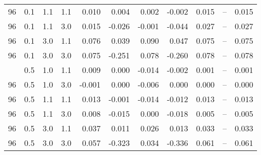 \begin{longtable}[t]{ccccrrrrrrc}
96 & 0.1 & 1.1 & 1.1 & 0.010 & 0.004 & 0.002 & -0.002 & 0.015 & -- & 0.015\\
96 & 0.1 & 1.1 & 3.0 & 0.015 & -0.026 & -0.001 & -0.044 & 0.027 & -- & 0.027\\
96 & 0.1 & 3.0 & 1.1 & 0.076 & 0.039 & 0.090 & 0.047 & 0.075 & -- & 0.075\\
96 & 0.1 & 3.0 & 3.0 & 0.075 & -0.251 & 0.078 & -0.260 & 0.078 & -- & 0.078\\
\addlinespace
96 & 0.5 & 1.0 & 1.1 & 0.009 & 0.000 & -0.014 & -0.002 & 0.001 & -- & 0.001\\
96 & 0.5 & 1.0 & 3.0 & -0.001 & 0.000 & -0.006 & 0.000 & 0.000 & -- & 0.000\\
96 & 0.5 & 1.1 & 1.1 & 0.013 & -0.001 & -0.014 & -0.012 & 0.013 & -- & 0.013\\
96 & 0.5 & 1.1 & 3.0 & 0.008 & -0.015 & 0.000 & -0.018 & 0.005 & -- & 0.005\\
96 & 0.5 & 3.0 & 1.1 & 0.037 & 0.011 & 0.026 & 0.013 & 0.033 & -- & 0.033\\
96 & 0.5 & 3.0 & 3.0 & 0.057 & -0.323 & 0.034 & -0.336 & 0.061 & -- & 0.061\\
\bottomrule
\end{longtable}
\endgroup{}
